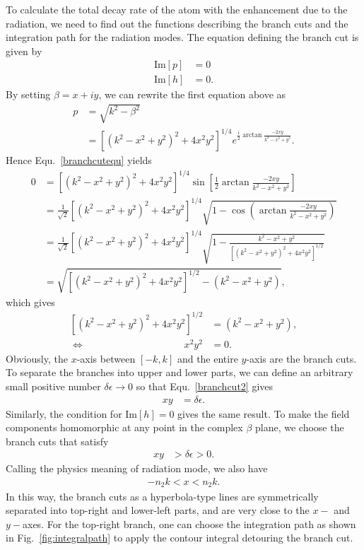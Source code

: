 To calculate the total decay rate of the atom with the enhancement due to the radiation, we need to find out the functions describing the branch cuts and the integration path for the radiation modes. The equation defining the branch cut is given by
\begin{align}\label{branchcutequ}
\mathrm{Im}\left[p \right] &=0\\
\mathrm{Im}\left[h\right] &=0.
\end{align}
By setting $ \beta=x+iy $, we can rewrite the first equation above as
\begin{align}
p&=\sqrt{k^2-\beta^2}\\
&=\left[(k^2-x^2+y^2)^2 + 4x^2y^2 \right]^{1/4}e^{\frac{i}{2}\arctan\frac{-2xy}{k^2-x^2+y^2}}.
\end{align}
Hence Equ.~\ref{branchcutequ} yields
\begin{align}
0&= \left[(k^2-x^2+y^2)^2 + 4x^2y^2 \right]^{1/4} \sin \left[\frac{1}{2}\arctan\frac{-2xy}{k^2-x^2+y^2} \right]\\
&= \frac{1}{\sqrt{2}} \left[(k^2\!-\! x^2\!+\! y^2)^2 \!+\! 4x^2y^2 \right]^{1/4} \sqrt{1\!-\!\cos \left(\arctan\frac{-2xy}{k^2\!-\! x^2\!+\! y^2} \right)}\\
&= \frac{1}{\sqrt{2}} \left[(k^2\!-\!x^2\!+\! y^2)^2 \!+\! 4x^2y^2 \right]^{1/4} \sqrt{1\!-\! \frac{k^2\!-\! x^2\!+\! y^2}{\left[(k^2\!-\! x^2\!+\! y^2)^2 \!+\! 4x^2y^2 \right]^{1/2}} }\\
&=\sqrt{\left[(k^2-x^2+y^2)^2 + 4x^2y^2 \right]^{1/2}-(k^2-x^2+y^2)},
\end{align}
which gives
\begin{align}
\left[(k^2-x^2+y^2)^2 + 4x^2y^2 \right]^{1/2}&=(k^2-x^2+y^2),\\
\Leftrightarrow \qquad \qquad \qquad \qquad \qquad x^2y^2&=0.\label{branchcut2}
\end{align}
Obviously, the $ x $-axis between $ [-k,k] $ and the entire $ y $-axis are the branch cuts. To separate the branches into upper and lower parts, we can define an arbitrary small positive number $ \delta\epsilon\rightarrow 0 $ so that Equ.~\ref{branchcut2} gives
\begin{align}
xy&=\delta\epsilon.
\end{align}
Similarly, the condition for $ \mathrm{Im}[h]=0 $ gives the same result. To make the field components homomorphic at any point in the complex $ \beta $ plane, we choose the branch cuts that satisfy 
\begin{align}
xy&>\delta\epsilon>0.
\end{align}
Calling the physics meaning of radiation mode, we also have 
\begin{align}
-n_2k<x<n_2k.
\end{align}
In this way, the branch cuts as a hyperbola-type lines are symmetrically separated into top-right and lower-left parts, and are very close to the $ x- $ and $ y- $axes. For the top-right branch, one can choose the integration path as shown in Fig.~\ref{fig:integralpath} to apply the contour integral detouring the branch cut. 

